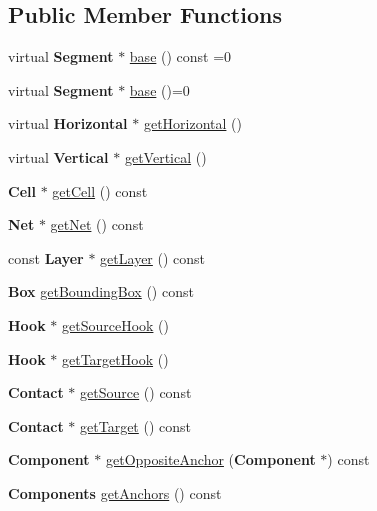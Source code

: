 \subsection*{Public Member Functions}
\begin{DoxyCompactItemize}
\item 
virtual {\bf Segment} $\ast$ \hyperlink{classKatabatic_1_1AutoSegment_a53877ff5ef48eb0030c2581a6eeb3c09}{base} () const =0
\item 
virtual {\bf Segment} $\ast$ \hyperlink{classKatabatic_1_1AutoSegment_ade416d0483aefe986988fa89a7cf6fcf}{base} ()=0
\item 
virtual {\bf Horizontal} $\ast$ \hyperlink{classKatabatic_1_1AutoSegment_a659b8ed90de679564924afe07af478de}{get\-Horizontal} ()
\item 
virtual {\bf Vertical} $\ast$ \hyperlink{classKatabatic_1_1AutoSegment_ab6a809b6f3ef3cf5385fa35580e31e7a}{get\-Vertical} ()
\item 
{\bf Cell} $\ast$ \hyperlink{classKatabatic_1_1AutoSegment_a148fdf09f18e7adb39a73c747f165266}{get\-Cell} () const 
\item 
{\bf Net} $\ast$ \hyperlink{classKatabatic_1_1AutoSegment_adf3e1a980233163de0ca34a5c3575998}{get\-Net} () const 
\item 
const {\bf Layer} $\ast$ \hyperlink{classKatabatic_1_1AutoSegment_a304ee4e02745811e04ac6fb688bf834f}{get\-Layer} () const 
\item 
{\bf Box} \hyperlink{classKatabatic_1_1AutoSegment_a4e70b34c1b87c093c4405d9d2e924a05}{get\-Bounding\-Box} () const 
\item 
{\bf Hook} $\ast$ \hyperlink{classKatabatic_1_1AutoSegment_a1defbbaef0a1975993e157a8d5f68ded}{get\-Source\-Hook} ()
\item 
{\bf Hook} $\ast$ \hyperlink{classKatabatic_1_1AutoSegment_ad62048f68151e5db987b5a7c79cce4ed}{get\-Target\-Hook} ()
\item 
{\bf Contact} $\ast$ \hyperlink{classKatabatic_1_1AutoSegment_a6f00fc7f0357778613214c4e57d9bc2f}{get\-Source} () const 
\item 
{\bf Contact} $\ast$ \hyperlink{classKatabatic_1_1AutoSegment_ac92a1ae33842aab5d067b393dd2596fe}{get\-Target} () const 
\item 
{\bf Component} $\ast$ \hyperlink{classKatabatic_1_1AutoSegment_a898ede38fc37409371bff9d7dc7f917a}{get\-Opposite\-Anchor} ({\bf Component} $\ast$) const 
\item 
{\bf Components} \hyperlink{classKatabatic_1_1AutoSegment_a7b72661b3586b369ebf3adc59a5239c2}{get\-Anchors} () const 

\end{DoxyCompactItemize}
